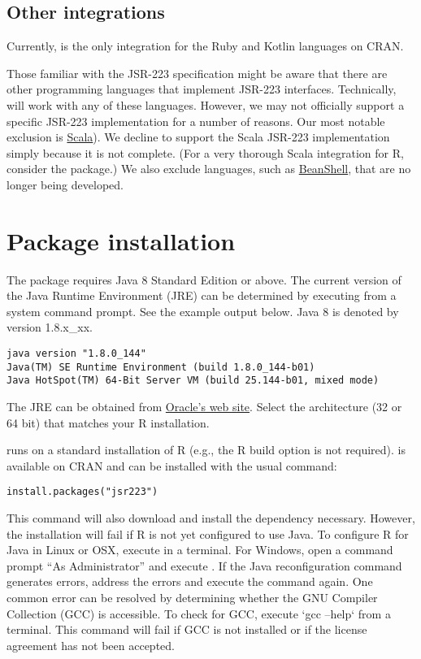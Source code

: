 \subsection{Other integrations}

Currently,  is the only integration for the Ruby and Kotlin languages on CRAN.

Those familiar with the JSR-223 specification might be aware that there are other programming languages that implement JSR-223 interfaces. Technically,  will work with any of these languages. However, we may not officially support a specific JSR-223 implementation for a number of reasons. Our most notable exclusion is \href{https://www.scala-lang.org/}{Scala}). We decline to support the Scala JSR-223 implementation simply because it is not complete. (For a very thorough Scala integration for R, consider the  package.) We also exclude languages, such as \href{http://www.beanshell.org/}{BeanShell}, that are no longer being developed.

\section{Package installation}

The  package requires Java 8 Standard Edition or above. The current version of the Java Runtime Environment (JRE) can be determined by executing  from a system command prompt. See the example output below. Java 8 is denoted by version 1.8.x\_xx.

\begin{verbatim}
java version "1.8.0_144"
Java(TM) SE Runtime Environment (build 1.8.0_144-b01)
Java HotSpot(TM) 64-Bit Server VM (build 25.144-b01, mixed mode)
\end{verbatim}

The JRE can be obtained from  \href{http://www.oracle.com/technetwork/java/javase/downloads/jre8-downloads-2133155.html}{Oracle's web site}. Select the architecture (32 or 64 bit) that matches your R installation.

 runs on a standard installation of R (e.g., the R build option  is not required).  is available on CRAN and can be installed with the usual command:

\begin{verbatim}
install.packages("jsr223")
\end{verbatim}
This command will also download and install the  dependency necessary. However, the  installation will fail if R is not yet configured to use Java. To configure R for Java in Linux or OSX, execute  in a terminal. For Windows, open a command prompt “As Administrator” and execute . If the Java reconfiguration command generates errors, address the errors and execute the command again. One common error can be resolved by determining whether the GNU Compiler Collection (GCC) is accessible. To check for GCC, execute `gcc --help` from a terminal. This command will fail if GCC is not installed or if the license agreement has not been accepted.

